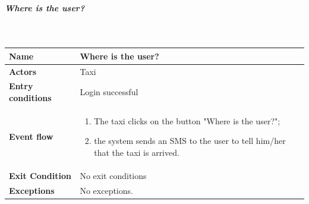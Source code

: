 		\subparagraph{Where is the user?}
		~\\[0.2cm]
		\vspace{20pt}
		\noindent
		\begin{tabular}{l l}
		 \textbf {Name} & Where is the user?  \\ \hline
		 \textbf{Actors} & Taxi \\ \hline
		 \textbf{Entry conditions} & Login successful \\ \hline
		 \textbf{Event flow} & 
		 \parbox{0.7\textwidth}{
		 \begin{enumerate}
		 \item The taxi clicks on the button "Where is the user?";
		 \item the system sends an SMS to the user to tell him/her that the taxi is arrived.
		 \end{enumerate}
		 } \\ \hline
		 \textbf{Exit Condition} & No exit conditions \\ \hline
		 \textbf{Exceptions} & No exceptions.
		\end{tabular}